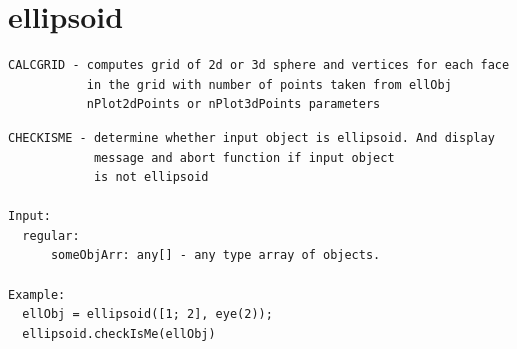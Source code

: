 \documentclass[letterpaper,10pt,english]{sphinxmanual}
\begin{document}
\section{ellipsoid}
\label{chap_func:ellipsoid}
\begin{Verbatim}[commandchars=\\\{\}]
CALCGRID - computes grid of 2d or 3d sphere and vertices for each face
           in the grid with number of points taken from ellObj
           nPlot2dPoints or nPlot3dPoints parameters
\end{Verbatim}

\begin{Verbatim}[commandchars=\\\{\}]
CHECKISME - determine whether input object is ellipsoid. And display
            message and abort function if input object
            is not ellipsoid

Input:
  regular:
      someObjArr: any[] - any type array of objects.

Example:
  ellObj = ellipsoid([1; 2], eye(2));
  ellipsoid.checkIsMe(ellObj)
\end{Verbatim}
\end{document}
